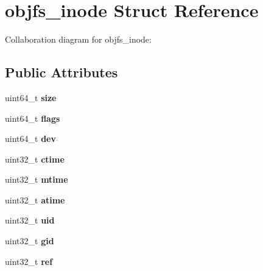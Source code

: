 \hypertarget{structobjfs__inode}{}\section{objfs\+\_\+inode Struct Reference}
\label{structobjfs__inode}


Collaboration diagram for objfs\+\_\+inode\+:
\subsection*{Public Attributes}
\begin{DoxyCompactItemize}
\item 
\mbox{\label{structobjfs__inode_ab65d48b88d5177faa8117a62df829025}} 
uint64\+\_\+t {\bfseries size}
\item 
\mbox{\label{structobjfs__inode_a7cba5e100ab01cf63047c4100c44a890}} 
uint64\+\_\+t {\bfseries flags}
\item 
\mbox{\label{structobjfs__inode_a83575753a341bfb727a414f8e1204429}} 
uint64\+\_\+t {\bfseries dev}
\item 
\mbox{\label{structobjfs__inode_a7f4b3473c42a58ab324791f67467701a}} 
uint32\+\_\+t {\bfseries ctime}
\item 
\mbox{\label{structobjfs__inode_a47a93256ef8fe774a6cc9bb49bcc6e40}} 
uint32\+\_\+t {\bfseries mtime}
\item 
\mbox{\label{structobjfs__inode_a4e50a2141af9652bb778b857d6fc1850}} 
uint32\+\_\+t {\bfseries atime}
\item 
\mbox{\label{structobjfs__inode_a2a16be72df58b7e593cd58f4676076c9}} 
uint32\+\_\+t {\bfseries uid}
\item 
\mbox{\label{structobjfs__inode_a0b4126ff2e13130e9a9e5c1958fea910}} 
uint32\+\_\+t {\bfseries gid}
\item 
\mbox{\label{structobjfs__inode_a5e51be5cde6ede2f8feec00563d81042}} 
uint32\+\_\+t {\bfseries ref}
\item 

\end{DoxyCompactItemize}
